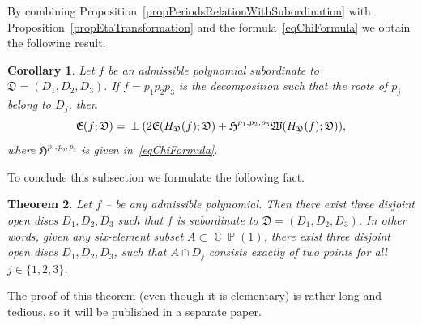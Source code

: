 \documentclass{amsart}
\numberwithin{equation}{section}
\newtheorem{theorem}{Theorem}[section]
\newtheorem{corollary}[theorem]{Corollary}
\theoremstyle{definition}
\theoremstyle{remark}
\DeclareMathOperator{\CC}{\mathbb C}
\DeclareMathOperator{\PP}{\mathbb P}
\begin{document}
	By combining Proposition~\ref{propPeriodsRelationWithSubordination} with Proposition~\ref{propEtaTransformation} and the formula~\eqref{eqChiFormula} we obtain the following result.
	\begin{corollary}
		Let $f$ be an admissible polynomial subordinate to $\mathfrak D = (D_1, D_2, D_3)$. If $f = p_1p_2p_3$ is the decomposition such that the roots of $p_j$ belong to $D_j$, then
		\begin{equation}\label{eqEMatrixTransform}
			\mathfrak E(f; \mathfrak D) = \\ \pm (2\mathfrak E(H_{\mathfrak D}(f);\mathfrak D) + \mathfrak H^{p_1,p_2,p_3}\mathfrak W(H_{\mathfrak D}(f); \mathfrak D)),
		\end{equation}
		where $\mathfrak H^{p_1,p_2,p_3}$ is given in~\eqref{eqChiFormula}.
	\end{corollary}
	
	To conclude this subsection we formulate the following fact.
	
	\begin{theorem}\label{thExistenceOfDiscs}
		Let $f$ -- be any admissible polynomial. Then there exist three disjoint open discs $D_1,D_2,D_3$ such that $f$ is subordinate to $\mathfrak D = (D_1,D_2,D_3)$. In other words, given any six-element subset $A \subset \CC\PP(1)$, there exist three disjoint open discs $D_1,D_2,D_3$, such that $A \cap D_j$ consists exactly of two points for all $j \in \{1,2,3\}$.
	\end{theorem}
	
	The proof of this theorem (even though it is elementary) is rather long and tedious, so it will be published in a separate paper.
	
\end{document}
